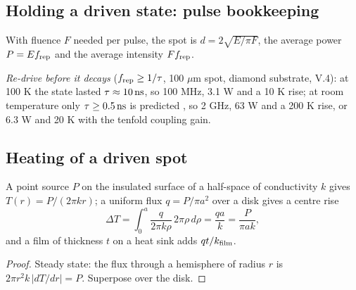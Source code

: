 \subsection{Holding a driven state: pulse bookkeeping}
\begin{statement}
With fluence $F$ needed per pulse, the spot is $d=2\sqrt{E/\pi F}$, the average power $P=Ef_{\rm rep}$ and the average intensity $Ff_{\rm rep}$.
\end{statement}
\par\noindent\emph{Re-drive before it decays} ($f_{\rm rep}\ge1/\tau$, 100 $\mu$m spot, diamond substrate, V.4): at 100 K the state lasted
$\tau\approx10\,\mathrm{ns}$, so 100 MHz, 3.1 W and a 10 K rise; at room temperature only $\tau\ge0.5\,\mathrm{ns}$ is predicted \cite{rowe}, so 2 GHz,
63 W and a 200 K rise, or 6.3 W and 20 K with the tenfold coupling gain.

\subsection{Heating of a driven spot}
\begin{statement}
A point source $P$ on the insulated surface of a half-space of conductivity $k$ gives $T(r)=P/(2\pi kr)$; a uniform flux $q=P/\pi a^2$ over a
disk gives a centre rise
\begin{equation}
\Delta T=\int_0^a\frac{q}{2\pi k\rho}\,2\pi\rho\,d\rho=\frac{qa}{k}=\frac{P}{\pi ak},\label{eq:spot}
\end{equation}
and a film of thickness $t$ on a heat sink adds $qt/k_{\rm film}$.
\end{statement}
\begin{proof}Steady state: the flux through a hemisphere of radius $r$ is $2\pi r^2k\,|dT/dr|=P$. Superpose over the disk.\end{proof}

